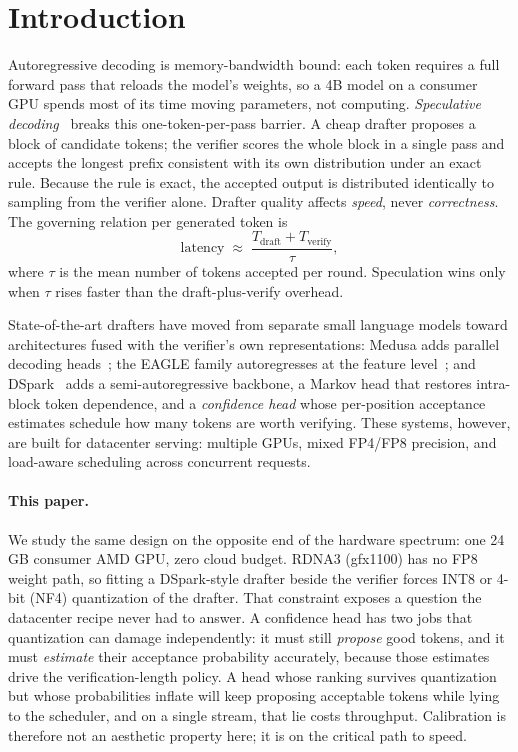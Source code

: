\documentclass[11pt]{article}
\theoremstyle{plain}
\theoremstyle{definition}
\begin{document}
\section{Introduction}
Autoregressive decoding is memory-bandwidth bound: each token requires a full
forward pass that reloads the model's weights, so a 4B model on a consumer GPU
spends most of its time moving parameters, not computing. \emph{Speculative
decoding}~\citep{leviathan2023,chen2023} breaks this one-token-per-pass barrier.
A cheap drafter proposes a block of candidate tokens; the verifier scores the
whole block in a single pass and accepts the longest prefix consistent with its
own distribution under an exact rule. Because the rule is exact, the accepted
output is distributed identically to sampling from the verifier alone. Drafter
quality affects \emph{speed}, never \emph{correctness}. The governing relation
per generated token is
\begin{equation}
\text{latency} \;\approx\; \frac{T_\text{draft} + T_\text{verify}}{\tau},
\label{eq:latency}
\end{equation}
where $\tau$ is the mean number of tokens accepted per round. Speculation wins
only when $\tau$ rises faster than the draft-plus-verify overhead.

State-of-the-art drafters have moved from separate small language models toward
architectures fused with the verifier's own representations: Medusa adds parallel
decoding heads~\citep{medusa2024}; the EAGLE family autoregresses at the feature
level~\citep{eagle2024,eagle2_2024,eagle3_2025}; and DSpark~\citep{dspark2026}
adds a semi-autoregressive backbone, a Markov head that restores intra-block
token dependence, and a \emph{confidence head} whose per-position acceptance
estimates schedule how many tokens are worth verifying. These systems, however,
are built for datacenter serving: multiple GPUs, mixed FP4/FP8 precision, and
load-aware scheduling across concurrent requests.

\paragraph{This paper.} We study the same design on the opposite end of the
hardware spectrum: one 24\,GB consumer AMD GPU, zero cloud budget. RDNA3
(gfx1100) has no FP8 weight path, so fitting a DSpark-style drafter beside the
verifier forces INT8 or 4-bit (NF4) quantization of the drafter. That constraint
exposes a question the datacenter recipe never had to answer. A confidence head
has two jobs that quantization can damage independently: it must still
\emph{propose} good tokens, and it must \emph{estimate} their acceptance
probability accurately, because those estimates drive the verification-length
policy. A head whose ranking survives quantization but whose probabilities
inflate will keep proposing acceptable tokens while lying to the scheduler, and
on a single stream, that lie costs throughput. Calibration is therefore not an
aesthetic property here; it is on the critical path to speed.
\end{document}
